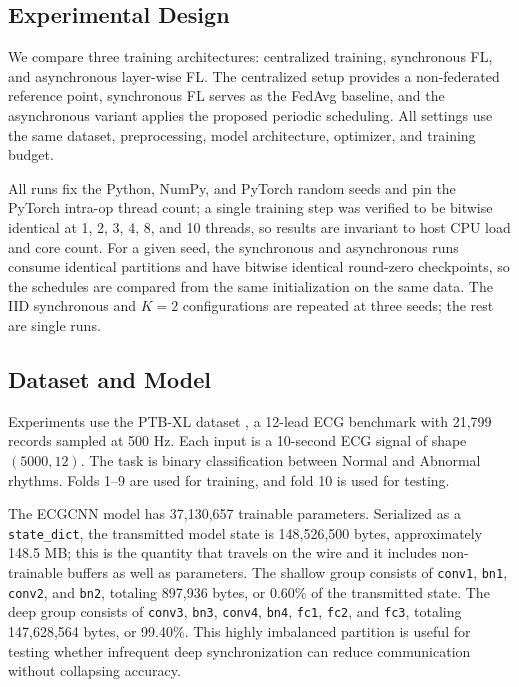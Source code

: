\documentclass[10pt,conference]{IEEEtran}
\begin{document}
\subsection{Experimental Design}

We compare three training architectures: centralized training, synchronous FL, and asynchronous layer-wise FL. The centralized setup provides a non-federated reference point, synchronous FL serves as the FedAvg baseline, and the asynchronous variant applies the proposed periodic scheduling. All settings use the same dataset, preprocessing, model architecture, optimizer, and training budget.

All runs fix the Python, NumPy, and PyTorch random seeds and pin the PyTorch intra-op thread count; a single training step was verified to be bitwise identical at 1, 2, 3, 4, 8, and 10 threads, so results are invariant to host CPU load and core count. For a given seed, the synchronous and asynchronous runs consume identical partitions and have bitwise identical round-zero checkpoints, so the schedules are compared from the same initialization on the same data. The IID synchronous and $K=2$ configurations are repeated at three seeds; the rest are single runs.

\subsection{Dataset and Model}

Experiments use the PTB-XL dataset \cite{wagner2020}, a 12-lead ECG benchmark with 21,799 records sampled at 500 Hz. Each input is a 10-second ECG signal of shape $(5000,12)$. The task is binary classification between Normal and Abnormal rhythms. Folds 1--9 are used for training, and fold 10 is used for testing.

The ECGCNN model has 37,130,657 trainable parameters. Serialized as a \texttt{state\_dict}, the transmitted model state is 148,526,500 bytes, approximately 148.5 MB; this is the quantity that travels on the wire and it includes non-trainable buffers as well as parameters. The shallow group consists of \texttt{conv1}, \texttt{bn1}, \texttt{conv2}, and \texttt{bn2}, totaling 897,936 bytes, or 0.60\% of the transmitted state. The deep group consists of \texttt{conv3}, \texttt{bn3}, \texttt{conv4}, \texttt{bn4}, \texttt{fc1}, \texttt{fc2}, and \texttt{fc3}, totaling 147,628,564 bytes, or 99.40\%. This highly imbalanced partition is useful for testing whether infrequent deep synchronization can reduce communication without collapsing accuracy.
\end{document}
